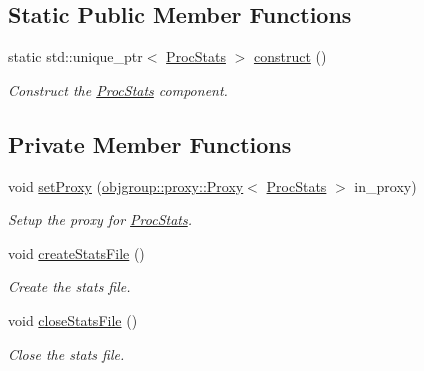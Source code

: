 \subsection*{Static Public Member Functions}
\begin{DoxyCompactItemize}
\item 
static std\+::unique\+\_\+ptr$<$ \hyperlink{structvt_1_1vrt_1_1collection_1_1balance_1_1_proc_stats}{Proc\+Stats} $>$ \hyperlink{structvt_1_1vrt_1_1collection_1_1balance_1_1_proc_stats_a2589f33e27eee819d91eb2c91816d34b}{construct} ()
\begin{DoxyCompactList}\small\item\em Construct the \hyperlink{structvt_1_1vrt_1_1collection_1_1balance_1_1_proc_stats}{Proc\+Stats} component. \end{DoxyCompactList}\end{DoxyCompactItemize}
\subsection*{Private Member Functions}
\begin{DoxyCompactItemize}
\item 
void \hyperlink{structvt_1_1vrt_1_1collection_1_1balance_1_1_proc_stats_a3215c14cb6679e9751b0fb51d5d72fe0}{set\+Proxy} (\hyperlink{structvt_1_1objgroup_1_1proxy_1_1_proxy}{objgroup\+::proxy\+::\+Proxy}$<$ \hyperlink{structvt_1_1vrt_1_1collection_1_1balance_1_1_proc_stats}{Proc\+Stats} $>$ in\+\_\+proxy)
\begin{DoxyCompactList}\small\item\em Setup the proxy for {\ttfamily \hyperlink{structvt_1_1vrt_1_1collection_1_1balance_1_1_proc_stats}{Proc\+Stats}}. \end{DoxyCompactList}\item 
void \hyperlink{structvt_1_1vrt_1_1collection_1_1balance_1_1_proc_stats_a03755a56bad3f32736c8f823671bc848}{create\+Stats\+File} ()
\begin{DoxyCompactList}\small\item\em Create the stats file. \end{DoxyCompactList}\item 
void \hyperlink{structvt_1_1vrt_1_1collection_1_1balance_1_1_proc_stats_a64048438517e6479b5c02f6136a19265}{close\+Stats\+File} ()
\begin{DoxyCompactList}\small\item\em Close the stats file. \end{DoxyCompactList}\end{DoxyCompactItemize}
